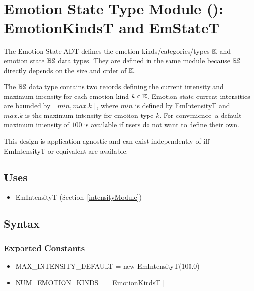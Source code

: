 \section{Emotion State Type Module (): EmotionKindsT and
EmStateT}\label{emotionstateModule}

The Emotion State ADT defines the emotion kinds/categories/types
$\mathbb{K}$ and emotion state $\mathbb{ES}$ data types. They are
defined in the same module because $\mathbb{ES}$ directly depends on the
size and order of $\mathbb{K}$.

The $\mathbb{ES}$ data type contains two records defining the current
intensity and maximum intensity for each emotion kind $k \in
\mathbb{K}$. Emotion state current intensities are bounded by
$[\mathit{min}, \mathit{max}.k]$, where $\mathit{min}$ is defined by
EmIntensityT and $\mathit{max}.k$ is the maximum intensity for emotion type
$k$. For convenience, a default maximum intensity of $100$ is available if
users do not want to define their own.

This design is application-agnostic and can exist independently of \progname{}
iff EmIntensityT or equivalent are available.

\subsection{Uses}
\begin{itemize}[noitemsep, nosep]

    \item EmIntensityT (Section~\ref{intensityModule})

\end{itemize}

\subsection{Syntax}

\subsubsection{Exported Constants}
\begin{itemize}

    \item MAX\_INTENSITY\_DEFAULT = new EmIntensityT(100.0)

    \item NUM\_EMOTION\_KINDS = $|$ EmotionKindsT $|$

\end{itemize}

